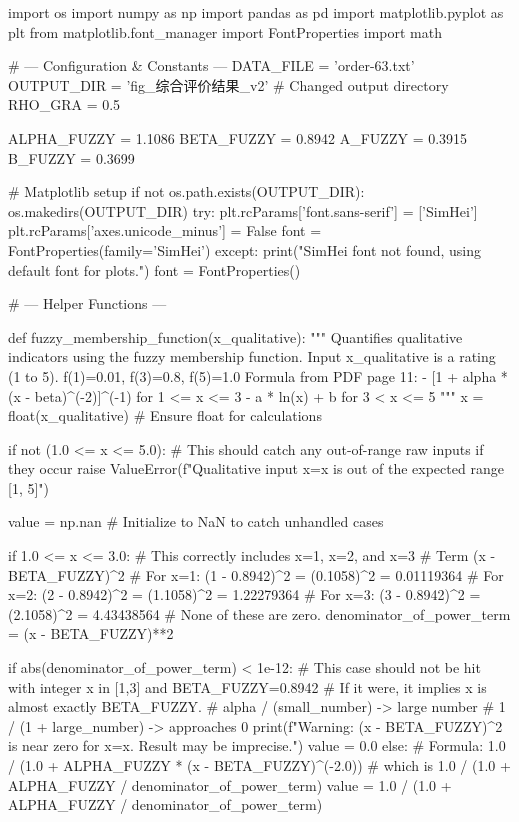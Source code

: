 \documentclass[12pt]{ctexart}
\begin{document}
\begin{python}
import os
import numpy as np
import pandas as pd
import matplotlib.pyplot as plt
from matplotlib.font_manager import FontProperties
import math

# --- Configuration & Constants ---
DATA_FILE = 'order-63.txt'
OUTPUT_DIR = 'fig_综合评价结果_v2' # Changed output directory
RHO_GRA = 0.5

ALPHA_FUZZY = 1.1086
BETA_FUZZY = 0.8942
A_FUZZY = 0.3915
B_FUZZY = 0.3699

# Matplotlib setup
if not os.path.exists(OUTPUT_DIR):
    os.makedirs(OUTPUT_DIR)
try:
    plt.rcParams['font.sans-serif'] = ['SimHei']
    plt.rcParams['axes.unicode_minus'] = False
    font = FontProperties(family='SimHei')
except:
    print("SimHei font not found, using default font for plots.")
    font = FontProperties()

# --- Helper Functions ---

def fuzzy_membership_function(x_qualitative):
    """
    Quantifies qualitative indicators using the fuzzy membership function.
    Input x_qualitative is a rating (1 to 5).
    f(1)=0.01, f(3)=0.8, f(5)=1.0
    Formula from PDF page 11:
    - [1 + alpha * (x - beta)^(-2)]^(-1)  for 1 <= x <= 3
    - a * ln(x) + b                       for 3 < x <= 5
    """
    x = float(x_qualitative) # Ensure float for calculations

    if not (1.0 <= x <= 5.0):
        # This should catch any out-of-range raw inputs if they occur
        raise ValueError(f"Qualitative input x={x} is out of the expected range [1, 5]")

    value = np.nan # Initialize to NaN to catch unhandled cases

    if 1.0 <= x <= 3.0: # This correctly includes x=1, x=2, and x=3
        # Term (x - BETA_FUZZY)^2
        # For x=1: (1 - 0.8942)^2 = (0.1058)^2 = 0.01119364
        # For x=2: (2 - 0.8942)^2 = (1.1058)^2 = 1.22279364
        # For x=3: (3 - 0.8942)^2 = (2.1058)^2 = 4.43438564
        # None of these are zero.
        denominator_of_power_term = (x - BETA_FUZZY)**2
        
        if abs(denominator_of_power_term) < 1e-12:
            # This case should not be hit with integer x in [1,3] and BETA_FUZZY=0.8942
            # If it were, it implies x is almost exactly BETA_FUZZY.
            # alpha / (small_number) -> large number
            # 1 / (1 + large_number) -> approaches 0
            print(f"Warning: (x - BETA_FUZZY)^2 is near zero for x={x}. Result may be imprecise.")
            value = 0.0 
        else:
            # Formula: 1.0 / (1.0 + ALPHA_FUZZY * (x - BETA_FUZZY)^(-2.0))
            # which is 1.0 / (1.0 + ALPHA_FUZZY / denominator_of_power_term)
            value = 1.0 / (1.0 + ALPHA_FUZZY / denominator_of_power_term)
            

\end{python}
\end{document}
